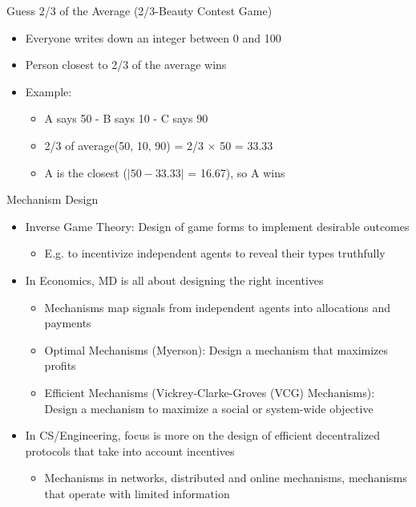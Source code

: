 \documentclass[11pt,aspectratio=169,handout]{beamer}
\begin{document}
  \begin{frame}{Guess 2/3 of the Average (2/3-Beauty Contest Game)}
   \begin{itemize}
    \item Everyone writes down an integer between 0 and 100
    \item Person closest to 2/3 of the average wins
    \pause
    \item Example:
    \begin{itemize}
     \item A says 50 - B says 10 - C says 90
     \item 2/3 of average(50, 10, 90) = 2/3 $\times$ 50 = 33.33
     \item A is the closest ($\vert 50-33.33\vert$ = 16.67), so A wins
    \end{itemize}
   \end{itemize}
  \end{frame}
  
  \begin{frame}{Mechanism Design}
   \begin{itemize}[<+->]
   \setlength{\itemsep}{1em}
    \item {\color{blue} Inverse Game Theory}: Design of game forms to implement desirable outcomes
    \begin{itemize}[<.->]
     \item E.g. to incentivize independent agents to reveal their types truthfully
    \end{itemize}
    \item In Economics, MD is all about designing the right incentives
    \begin{itemize}[<.->]
     \item Mechanisms map \alert{signals} from independent agents into allocations and payments
     \item Optimal Mechanisms (Myerson): Design a mechanism that maximizes profits
     \item Efficient Mechanisms (Vickrey-Clarke-Groves (VCG) Mechanisms): Design a mechanism to maximize a \alert{social} or system-wide objective
    \end{itemize}
    \item In CS/Engineering, focus is more on the design of efficient decentralized protocols that take into account incentives
    \begin{itemize}[<.->]
     \item Mechanisms in networks, distributed and online mechanisms, mechanisms that operate with limited information
    \end{itemize}
   \end{itemize}
  \end{frame}
  
\end{document}

